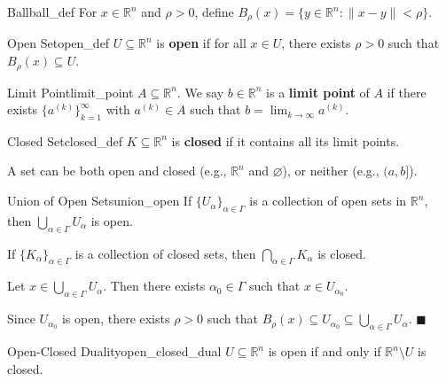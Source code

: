 \documentclass[11pt, letterpaper, openany]{book}
\renewenvironment{proof}[1][\proofname]{%
  \tcolorbox[blanker, breakable, left=1em,
    before skip=1em, after skip=1em,
    borderline west={2pt}{0pt}{MagicTeal!50},
    colback=MagicCream,
    before upper={\textcolor{MagicTeal}{\sffamily\bfseries #1.}\space}
  ]%
}{%
  \hfill\textcolor{MagicTeal}{\ensuremath{\blacksquare}}\endtcolorbox%
}
\begin{document}
\begin{defn}{Ball}{ball_def}
For $x \in \mathbb{R}^n$ and $\rho > 0$, define $B_\rho(x) = \{y \in \mathbb{R}^n : \|x - y\| < \rho\}$.
\end{defn}

\begin{defn}{Open Set}{open_def}
$U \subseteq \mathbb{R}^n$ is \textbf{open} if for all $x \in U$, there exists $\rho > 0$ such that $B_\rho(x) \subseteq U$.
\end{defn}

\begin{defn}{Limit Point}{limit_point}
$A \subseteq \mathbb{R}^n$. We say $b \in \mathbb{R}^n$ is a \textbf{limit point} of $A$ if there exists $\{a^{(k)}\}_{k=1}^\infty$ with $a^{(k)} \in A$ such that $b = \lim_{k\to\infty} a^{(k)}$.
\end{defn}

\begin{defn}{Closed Set}{closed_def}
$K \subseteq \mathbb{R}^n$ is \textbf{closed} if it contains all its limit points.
\end{defn}

\begin{remark}
A set can be both open and closed (e.g., $\mathbb{R}^n$ and $\varnothing$), or neither (e.g., $(a,b]$).
\end{remark}

\begin{thm}{Union of Open Sets}{union_open}
If $\{U_\alpha\}_{\alpha \in \Gamma}$ is a collection of open sets in $\mathbb{R}^n$, then $\bigcup_{\alpha \in \Gamma} U_\alpha$ is open.

If $\{K_\alpha\}_{\alpha \in \Gamma}$ is a collection of closed sets, then $\bigcap_{\alpha \in \Gamma} K_\alpha$ is closed.
\end{thm}

\begin{proof}
Let $x \in \bigcup_{\alpha \in \Gamma} U_\alpha$. Then there exists $\alpha_0 \in \Gamma$ such that $x \in U_{\alpha_0}$.

Since $U_{\alpha_0}$ is open, there exists $\rho > 0$ such that $B_\rho(x) \subseteq U_{\alpha_0} \subseteq \bigcup_{\alpha \in \Gamma} U_\alpha$.
\end{proof}

\begin{thm}{Open-Closed Duality}{open_closed_dual}
$U \subseteq \mathbb{R}^n$ is open if and only if $\mathbb{R}^n \setminus U$ is closed.
\end{thm}
\end{document}
